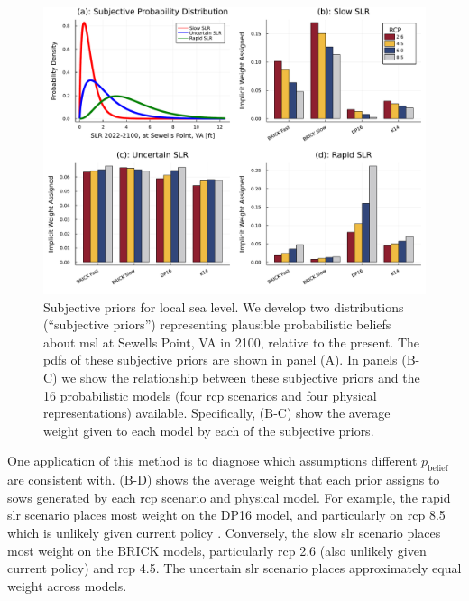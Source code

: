 \documentclass[11pt]{article}
\begin{document}
\begin{figure}
    \centering
    \includegraphics[width=\textwidth]{lsl-priors-weights}
    \caption{
        Subjective priors for local sea level.
        We develop two distributions (``subjective priors'') representing plausible probabilistic beliefs about \gls{msl} at Sewells Point, VA in 2100, relative to the present.
        The \glspl{pdf} of these subjective priors are shown in panel (A).
        In panels (B-C) we show the relationship between these subjective priors and the 16 probabilistic models (four \gls{rcp} scenarios and four physical representations) available.
        Specifically, (B-C) show the average weight given to each model by each of the subjective priors.
    }\label{fig:lsl-priors-weights}
\end{figure}

One application of this method is to diagnose which assumptions different $p_\text{belief}$ are consistent with.
(B-D) shows the average weight that each prior assigns to \glspl{sow} generated by each \gls{rcp} scenario and physical model.
For example, the rapid \gls{slr} scenario places most weight on the DP16 model, and particularly on \gls{rcp} 8.5 which is unlikely given current policy \citep{hausfather_scenarios:2020,srikrishnan_probabilistic:2022}.
Conversely, the slow \gls{slr} scenario places most weight on the BRICK models, particularly \gls{rcp} 2.6 (also unlikely given current policy) and \gls{rcp} 4.5.
The uncertain \gls{slr} scenario places approximately equal weight across models.
\end{document}
